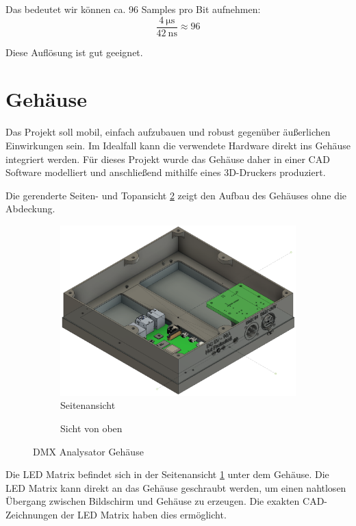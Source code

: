 Das bedeutet wir können ca. 96 Samples pro Bit aufnehmen:
\[\frac{\SI{4}{\us}}{\SI{42}{\ns}} \approx 96\]

Diese Auflösung ist gut geeignet.


\section{Gehäuse}

Das Projekt soll mobil, einfach aufzubauen und robust gegenüber äußerlichen Einwirkungen sein. Im Idealfall kann die verwendete Hardware direkt ins Gehäuse integriert werden. Für dieses Projekt wurde das Gehäuse daher in einer CAD Software modelliert und anschließend mithilfe eines 3D-Druckers produziert.

Die gerenderte Seiten- und Topansicht \ref{DmxCaseRender} zeigt den Aufbau des Gehäuses ohne die Abdeckung. 
\begin{figure}[H]
	\centering
	\begin{subfigure}{.5\textwidth}
		\centering
		\includegraphics[width=0.9\linewidth]{Pictures/DmxCaseSideways}
		\caption{Seitenansicht}
		\label{DmxCaseSideViewRender}
	\end{subfigure}%
	\begin{subfigure}{.5\textwidth}
		\centering
		\caption{Sicht von oben}
	\end{subfigure}
	\caption{DMX Analysator Gehäuse}
	\label{DmxCaseRender}
\end{figure}

Die LED Matrix befindet sich in der Seitenansicht \ref{DmxCaseSideViewRender} unter dem Gehäuse. Die LED Matrix kann direkt an das Gehäuse geschraubt werden, um einen nahtlosen Übergang zwischen Bildschirm und Gehäuse zu erzeugen. Die exakten CAD-Zeichnungen \cite[S.1]{LedMatrixCadDrawings} der LED Matrix haben dies ermöglicht.

